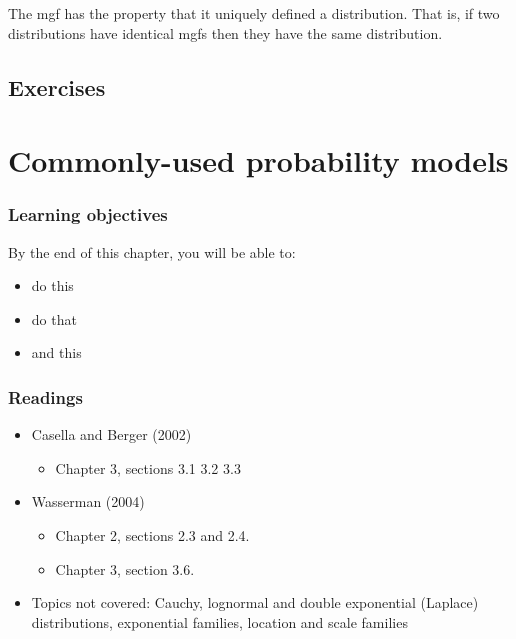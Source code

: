 \documentclass[
]{book}
\providecommand{\tightlist}{%
  \setlength{\itemsep}{0pt}\setlength{\parskip}{0pt}}
\theoremstyle{definition}
\theoremstyle{definition}
\theoremstyle{definition}
\theoremstyle{definition}
\theoremstyle{remark}
\begin{document}
The mgf has the property that it uniquely defined a distribution.
That is, if two distributions have identical mgfs then they have the same distribution.

\hypertarget{exercises}{%
\section{Exercises}\label{exercises}}

\hypertarget{commonly-used-probability-models}{%
\chapter{Commonly-used probability models}\label{commonly-used-probability-models}}

\hypertarget{learning-objectives-1}{%
\subsection*{Learning objectives}\label{learning-objectives-1}}

By the end of this chapter, you will be able to:

\begin{itemize}
\tightlist
\item
  do this
\item
  do that
\item
  and this
\end{itemize}

\hypertarget{readings-1}{%
\subsection*{Readings}\label{readings-1}}

\begin{itemize}
\tightlist
\item
  Casella and Berger (2002)

  \begin{itemize}
  \tightlist
  \item
    Chapter 3, sections 3.1 3.2 3.3
  \end{itemize}
\item
  Wasserman (2004)

  \begin{itemize}
  \tightlist
  \item
    Chapter 2, sections 2.3 and 2.4.
  \item
    Chapter 3, section 3.6.
  \end{itemize}
\item
  Topics not covered: Cauchy, lognormal and double exponential (Laplace) distributions, exponential families, location and scale families
\end{itemize}
\end{document}
